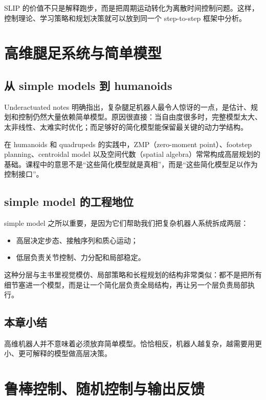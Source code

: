 \documentclass[a4paper]{article}
\begin{document}
SLIP 的价值不只是解释跑步，而是把周期运动转化为离散时间控制问题。这样，控制理论、学习策略和规划决策就可以放到同一个 step-to-step 框架中分析。

\section{高维腿足系统与简单模型}

\subsection{从 simple models 到 humanoids}

Underactuated notes 明确指出，复杂腿足机器人最令人惊讶的一点，是估计、规划和控制仍然大量依赖简单模型。原因很直接：当自由度很多时，完整模型太大、太非线性、太难实时优化；而足够好的简化模型能保留最关键的动力学结构。

在 humanoids 和 quadrupeds 的实践中，ZMP（zero-moment point）、footstep planning、centroidal model 以及空间代数（spatial algebra）常常构成高层规划的基础。课程中的意思不是“这些简化模型就是真相”，而是“这些简化模型足以作为控制接口”。

\subsection{simple model 的工程地位}

simple model 之所以重要，是因为它们帮助我们把复杂机器人系统拆成两层：
\begin{itemize}
  \item 高层决定步态、接触序列和质心运动；
  \item 低层负责关节控制、力分配和局部稳定。
\end{itemize}

这种分层与主书里视觉模仿、局部策略和长程规划的结构非常类似：都不是把所有细节塞进一个模型，而是让一个简化层负责全局结构，再让另一个层负责局部执行。

\subsection{本章小结}

高维机器人并不意味着必须放弃简单模型。恰恰相反，机器人越复杂，越需要用更小、更可解释的模型做高层决策。

\section{鲁棒控制、随机控制与输出反馈}
\end{document}
